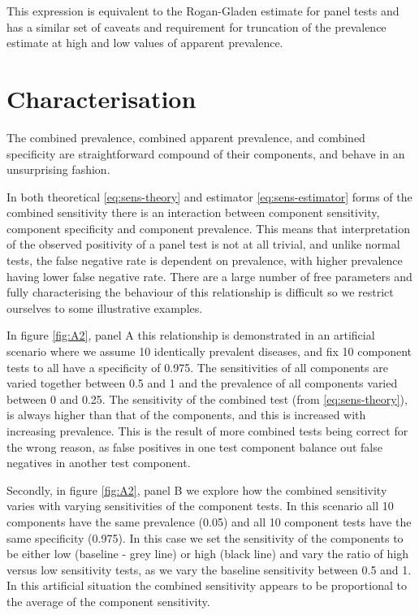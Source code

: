 \documentclass[a4paper, 12pt, twoside]{article}
\let\Oldsection\section
\renewcommand{\section}{\FloatBarrier\Oldsection}
\begin{document}
This expression is equivalent to the Rogan-Gladen estimate for panel tests and has a similar set of caveats and requirement for truncation of the prevalence estimate at high and low values of apparent prevalence.

\section{Characterisation}

The combined prevalence, combined apparent prevalence, and combined specificity are straightforward compound of their components, and behave in an unsurprising fashion.

In both theoretical \eqref{eq:sens-theory} and estimator \eqref{eq:sens-estimator} forms of the combined sensitivity there is an interaction between component sensitivity, component specificity and component prevalence. This means that interpretation of the observed positivity of a panel test is not at all trivial, and unlike normal tests, the false negative rate is dependent on prevalence, with higher prevalence having lower false negative rate. There are a large number of free parameters and fully characterising the behaviour of this relationship is difficult so we restrict ourselves to some illustrative examples.

In figure \ref{fig:A2}, panel A this relationship is demonstrated in an artificial scenario where we assume 10 identically prevalent diseases, and fix 10 component tests to all have a specificity of 0.975. The sensitivities of all components are varied together between 0.5 and 1 and the prevalence of all components varied between 0 and 0.25. The sensitivity of the combined test (from \eqref{eq:sens-theory}), is always higher than that of the components, and this is increased with increasing prevalence. This is the result of more combined tests being correct for the wrong reason, as false positives in one test component balance out false negatives in another test component.

Secondly, in figure \ref{fig:A2}, panel B we explore how the combined sensitivity varies with varying sensitivities of the component tests. In this scenario all 10 components have the same prevalence (0.05) and all 10 component tests have the same specificity (0.975). In this case we set the sensitivity of the components to be either low (baseline - grey line) or high (black line) and vary the ratio of high versus low sensitivity tests, as we vary the baseline sensitivity between 0.5 and 1. In this artificial situation the combined sensitivity appears to be proportional to the average of the component sensitivity.
\end{document}
